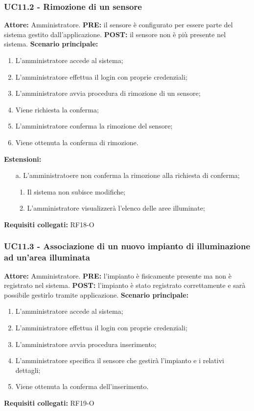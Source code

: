 \documentclass[a4paper, 12pt]{article}
\begin{document}
\subsubsection{UC11.2 - Rimozione di un sensore}
\textbf{Attore:} Amministratore.\newline
\textbf{PRE:} il sensore è configurato per essere parte del sistema gestito dall'applicazione.\newline
\textbf{POST:} il sensore non è più presente nel sistema.\newline
\textbf{Scenario principale:}
\begin{enumerate}
    \item L'amministratore accede al sistema;
    \item L'amministratore effettua il login con proprie credenziali;
    \item L'amministratore avvia procedura di rimozione di un sensore;
    \item Viene richiesta la conferma;
    \item L'amministratore conferma la rimozione del sensore;
    \item Viene ottenuta la conferma di rimozione.
\end{enumerate}
\textbf{Estensioni:}
\begin{itemize}
    \item [a.] L'amministratoere non conferma la rimozione alla richiesta di conferma;
    \begin{enumerate}
        \item Il sistema non subisce modifiche;
        \item L'amministratore visualizzerà l'elenco delle aree illuminate;
    \end{enumerate}
\end{itemize}
\textbf{Requisiti collegati:} RF18-O\newline

\subsubsection{UC11.3 - Associazione di un nuovo impianto di illuminazione ad un'area illuminata}
\textbf{Attore:} Amministratore.\newline
\textbf{PRE:} l'impianto è fisicamente presente ma non è registrato nel sistema.\newline
\textbf{POST:} l'impianto è stato registrato correttamente e sarà possibile gestirlo tramite applicazione.\newline
\textbf{Scenario principale:}
\begin{enumerate}
    \item L'amministratore accede al sistema;
    \item L'amministratore effettua il login con proprie credenziali;
    \item L'amministratore avvia procedura inserimento;
    \item L'amministratore specifica il sensore che gestirà l'impianto e i relativi dettagli;
    \item Viene ottenuta la conferma dell'inserimento.
\end{enumerate}
\textbf{Requisiti collegati:} RF19-O\newline
\end{document}
